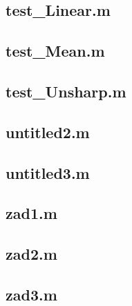 \subsection*{ test\_Linear.m      } \newpage
\subsection*{ test\_Mean.m        } \newpage
\subsection*{ test\_Unsharp.m     } \newpage
\subsection*{ untitled2.m         } \newpage
\subsection*{ untitled3.m         } \newpage
\subsection*{ zad1.m              } \newpage
\subsection*{ zad2.m              } \newpage
\subsection*{ zad3.m              } \newpage



